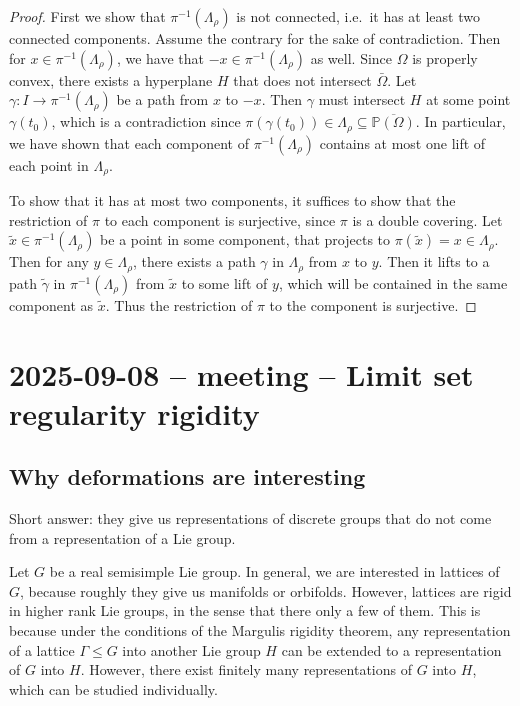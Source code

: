 \documentclass{report}
\begin{document}
\begin{itemize}
    \begin{proof}
        First we show that $\pi^{-1}(\Lambda_\rho)$ is not connected, i.e.\ it has at least two connected components.
        Assume the contrary for the sake of contradiction.
        Then for $x \in \pi^{-1}(\Lambda_\rho)$, we have that $-x \in \pi^{-1}(\Lambda_\rho)$ as well.
        Since $\Omega$ is properly convex, there exists a hyperplane $H$ that does not intersect $\bar \Omega$.
        Let $\gamma: I \to \pi^{-1}(\Lambda_\rho)$ be a path from $x$ to $-x$.
        Then $\gamma$ must intersect $H$ at some point $\gamma(t_0)$, which is a contradiction since $\pi(\gamma(t_0)) \in \Lambda_\rho \subseteq \overline{\mathbb P(\Omega)}$.
        In particular, we have shown that each component of $\pi^{-1}(\Lambda_\rho)$ contains at most one lift of each point in $\Lambda_\rho$.

        To show that it has at most two components, it suffices to show that the restriction of $\pi$ to each component is surjective, since $\pi$ is a double covering.
        Let $\tilde x \in \pi^{-1}(\Lambda_\rho)$ be a point in some component, that projects to $\pi(\tilde x) = x \in \Lambda_\rho$.
        Then for any $y \in \Lambda_\rho$, there exists a path $\gamma$ in $\Lambda_\rho$ from $x$ to $y$.
        Then it lifts to a path $\tilde \gamma$ in $\pi^{-1}(\Lambda_\rho)$ from $\tilde x$ to some lift of $y$, which will be contained in the same component as $\tilde x$.
        Thus the restriction of $\pi$ to the component is surjective.
    \end{proof}
\end{itemize}
\section{2025-09-08 -- meeting -- Limit set regularity rigidity}
\subsection{Why deformations are interesting}
Short answer: they give us representations of discrete groups that do not come from a representation of a Lie group.

Let $G$ be a real semisimple Lie group.
In general, we are interested in lattices of $G$, because roughly they give us manifolds or orbifolds.
However, lattices are rigid in higher rank Lie groups, in the sense that there only a few of them.
This is because under the conditions of the Margulis rigidity theorem, any representation of a lattice $\Gamma \leq G$ into another Lie group $H$ can be extended to a representation of $G$ into $H$.
However, there exist finitely many representations of $G$ into $H$, which can be studied individually.
\end{document}
